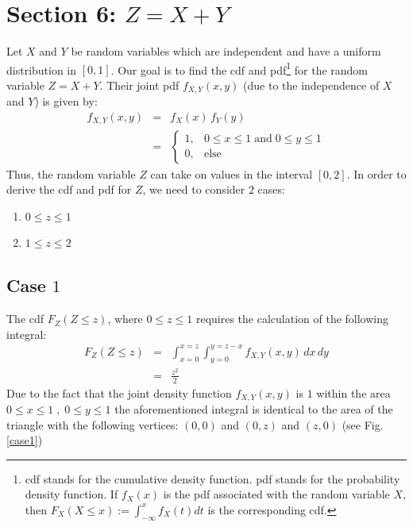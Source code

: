 \documentclass[12pt]{article}
\title{\centering{Notes to Hands-on Intro to R}}
\author{Wim R.\,M.\, Cardoen\\
	Center for High-Performance Computing (CHPC)\\
	University of Utah}
\theoremstyle{definition}
\theoremstyle{remark}
\begin{document}
\date{\today}
\maketitle
\thispagestyle{empty}
\pagestyle{plain}
\setcounter{page}{1}
\renewcommand \thesection{\Roman{section}}

\section*{Section 6: $Z=X+Y$}
Let $X$ and $Y$ be random variables which are independent and have a uniform distribution in $[0,1]$.
Our goal is to find the cdf and pdf\footnote{cdf stands for the cumulative density function. pdf stands for the probability density function. 
If $f_X(x)$ is the pdf associated with the random variable $X$, then $F_X(X\le x):= \int_{-\infty}^x f_X(t) dt$ is the corresponding cdf.} for the random variable $Z=X+Y$. \newline
Their joint pdf $f_{X,Y}(x,y)$ (due to the independence of $X$ and $Y$) is given by:
\begin{eqnarray}
	f_{X,Y}(x,y) & = &f_X(x)\,f_Y(y) \nonumber \\
		     & = & \begin{cases}
			 1, & 0\le x \le 1\; \text{and} \;0\le y \le 1 \nonumber  \\
			     0, & \text{else}
		     \end{cases}    
\end{eqnarray}	
Thus, the random variable $Z$ can take on values in the interval $[0,2]$.
In order to derive the cdf and pdf for $Z$, we need to consider $2$ cases:
\begin{enumerate}
    \item $0\le z \le 1$
    \item $1 \le z \le 2$	    
\end{enumerate}		

\subsection*{Case $1$}
The cdf $F_Z(Z\le z)$, where $0\le z \le 1$ requires 
the calculation of the following integral:
\begin{eqnarray}
        F_Z(Z \le z) &= & \int_{x=0}^{x=z} \int_{y=0}^{y=z-x} f_{X,Y}(x,y)\,dx\,dy \nonumber \\
              & =& \frac{z^2}{2} \nonumber
\end{eqnarray} 
Due to the fact that the joint density function $f_{X,Y}(x,y)$ is $1$ within the area $0\le x \le 1\; , \;0\le y \le 1$ the 
aforementioned integral is identical to the area of the triangle with the following vertices:
$(0,0)$ and $(0,z)$ and $(z,0)$ (see Fig.\,\ref{case1})
\end{document}
